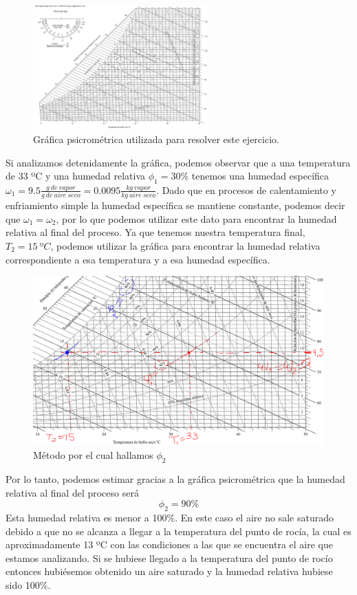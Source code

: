 \documentclass[12pt, letterpaper]{article}
\begin{document}
\begin{figure}[H]
	\centering
	\includegraphics[width=0.6\textwidth]{1.png}
	\caption{Gráfica psicrométrica utilizada para resolver este ejercicio.}
\end{figure}
Si analizamos detenidamente la gráfica, podemos observar que a una temperatura de 33 ºC y una humedad relativa $\phi_1 = 30\%$ tenemos una humedad específica $\omega_1 = 9.5 \frac{g\ de\ vapor}{g\ de\ aire\ seco} = 0.0095 \frac{kg\ vapor}{kg\ aire\ seco}$. Dado que en procesos de calentamiento y enfriamiento simple la humedad específica se mantiene constante, podemos decir que $\omega_1 = \omega_2$, por lo que podemos utilizar este dato para encontrar la humedad relativa al final del proceso. Ya que tenemos nuestra temperatura final, $T_2 = 15\ ºC$, podemos utilizar la gráfica para encontrar la humedad relativa correspondiente a esa temperatura y a esa humedad específica.
\begin{figure}[H]
	\centering
	\includegraphics[width=\textwidth]{2.png}
	\caption{Método por el cual hallamos $\phi_2$}
\end{figure}

Por lo tanto, podemos estimar gracias a la gráfica psicrométrica que la humedad relativa al final del proceso será
\begin{equation}
	\boxed{\phi_2 = 90\%}
\end{equation}
Esta humedad relativa es menor a 100\%. En este caso el aire no sale saturado debido a que no se alcanza a llegar a la temperatura del punto de rocía, la cual es aproximadamente 13 ºC con las condiciones a las que se encuentra el aire que estamos analizando. Si se hubiese llegado a la temperatura del punto de rocío entonces hubiésemos obtenido un aire saturado y la humedad relativa hubiese sido 100\%.
\\
\end{document}
